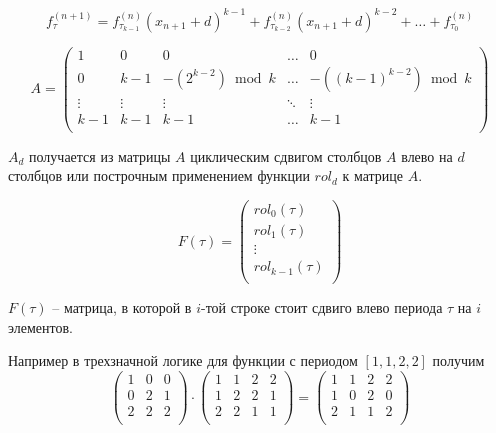 \documentclass[bibliography=totoc, a4paper, 14pt]{extarticle}
\begin{document}
$$f_{\tau}^{(n+1)} = f_{\tau_{k-1}}^{(n)}(x_{n+1}+d)^{k-1} + f_{\tau_{k-2}}^{(n)}(x_{n+1}+d)^{k-2} + \ldots + f_{\tau_{0}}^{(n)}$$

$$
A = \begin{pmatrix}
1      & 0      & 0                  & \ldots & 0                      \\
0      & k-1    & -(2^{k-2}) \bmod k & \ldots & -((k-1)^{k-2}) \bmod k \\
\vdots & \vdots &  \vdots            & \ddots & \vdots                 \\
k-1    & k-1    & k-1                & \ldots & k-1                    \\
\end{pmatrix}
$$

$A_d$ получается из матрицы $A$ циклическим сдвигом столбцов $A$ влево на $d$ столбцов или построчным применением
функции $rol_d$ к матрице $A$.

$$
F(\tau) = \begin{pmatrix}
rol_0(\tau)     \\
rol_1(\tau)     \\
\vdots          \\
rol_{k-1}(\tau) \\
\end{pmatrix}
$$

$F(\tau)$ -- матрица, в которой в $i$-той строке стоит сдвиго влево периода $\tau$ на $i$ элементов.

Например в трехзначной логике для функции с периодом $[1,1,2,2]$ получим
$$
\begin{pmatrix}
1 & 0 & 0 \\
0 & 2 & 1 \\
2 & 2 & 2 \\
\end{pmatrix}
\cdot
\begin{pmatrix}
1 & 1 & 2 & 2 \\
1 & 2 & 2 & 1 \\
2 & 2 & 1 & 1 \\
\end{pmatrix}
=
\begin{pmatrix}
1 & 1 & 2 & 2 \\
1 & 0 & 2 & 0 \\
2 & 1 & 1 & 2 \\
\end{pmatrix}
$$

\end{document}
